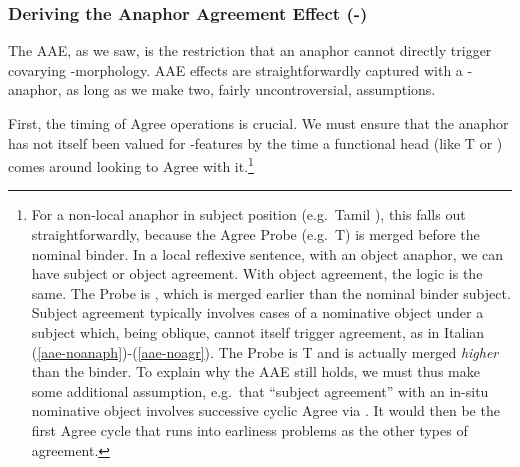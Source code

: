 \documentclass[output=paper, modfonts, nonflat]{langsci/langscibook}
\begin{document}
\subsubsection{Deriving the Anaphor Agreement Effect (\nul-\person)}

The AAE, as we saw, is the restriction that an anaphor cannot directly
trigger covarying \ph-morphology.  AAE effects are straightforwardly
captured with a \nul-\person{} anaphor, as long as we make two, fairly
uncontroversial, assumptions.

First, the timing of Agree operations is crucial. We must ensure that
the anaphor has not itself been valued for \ph-features by the time a
functional head (like T or \lilv) comes around looking to Agree with
it.\footnote{For a non-local anaphor in subject position (e.g.\ Tamil
  \taan \phantom{t}\citealp{sundaresan:2016a, sundaresan:2018}), this falls out
  straightforwardly, because the Agree Probe (e.g.\ T) is merged
  before the nominal binder. In a local reflexive sentence, with an
  object anaphor, we can have subject or object agreement. With object
  agreement, the logic is the same. The Probe is \lilv, which is
  merged earlier than the nominal binder subject. Subject agreement
  typically involves cases of a nominative object under a subject
  which, being oblique, cannot itself trigger agreement, as in Italian
  (\ref{aae-noanaph})-(\ref{aae-noagr}). The Probe is T and is
  actually merged \emph{higher} than the binder. To explain why the
  AAE still holds, we must thus make some additional assumption, e.g.\
  that ``subject agreement'' with an in-situ nominative object
  involves successive cyclic Agree via \lilv. It would then be the
  first Agree cycle that runs into earliness problems as the other
  types of agreement.}
\end{document}

